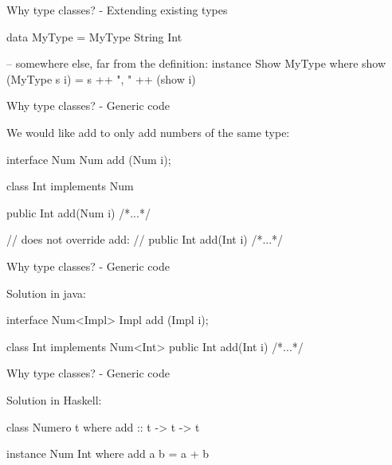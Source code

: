 \documentclass[13pt]{beamer}
\begin{document}
\begin{frame}[fragile]{Why type classes? - Extending existing types}

  \begin{haskellCode}
    data MyType = MyType String Int

    -- somewhere else, far from the definition:
    instance Show MyType where
      show (MyType s i) = s ++ ", " ++ (show i)
  \end{haskellCode}


\end{frame}

\begin{frame}[fragile]{Why type classes? - Generic code}

  We would like add to only add numbers of the same type: \\

  \begin{javaCode}
    interface Num {
      Num add (Num i);
    }

    class Int implements Num {
      public Int add(Num i) { /*...*/ }
      
      // does not override add:
      // public Int add(Int i) { /*...*/ }
    }
  \end{javaCode}

\end{frame}

\begin{frame}[fragile]{Why type classes? - Generic code}

  Solution in java: \\

  \begin{javaCode}
    interface Num<Impl> {
      Impl add (Impl i);
    }
    
    class Int implements Num<Int> {
      public Int add(Int i) { /*...*/ }
    }
  \end{javaCode}

\end{frame}

\begin{frame}[fragile]{Why type classes? - Generic code}

  Solution in Haskell: \\

  \begin{haskellCode}
      class Numero t where
        add :: t -> t -> t

      instance Num Int where
        add a b = a + b
  \end{haskellCode}

\end{frame}
\end{document}
